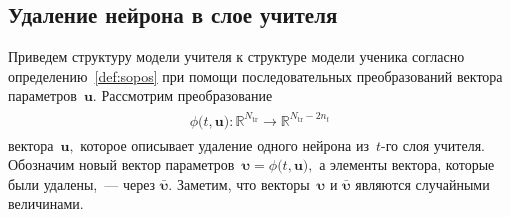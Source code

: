 \documentclass[12pt]{a&t}
\begin{document}
\subsection{Удаление нейрона в слое учителя}
Приведем структуру модели учителя к структуре модели ученика согласно определению~\ref{def:sopos} при помощи последовательных преобразований вектора параметров~$\mathbf{u}$. Рассмотрим преобразование
\begin{gather}
\label{eq:ap:2}
\begin{aligned}
\phi\bigr(t, \mathbf{u}\bigr) : \mathbb{R}^{N_{\text{tr}}} \to \mathbb{R}^{N_{\text{tr}}-2n_t}
\end{aligned}
\end{gather}
вектора~$\mathbf{u},$ которое описывает удаление одного нейрона из~$t$-го слоя учителя.
Обозначим новый вектор параметров~$\bm{\upsilon} =  \phi\bigr(t, \mathbf{u}\bigr),$ а элементы вектора, которые были удалены,~--- через $\bar{\bm{\upsilon}}.$ Заметим, что векторы~$\bm{\upsilon}$ и $\bar{\bm{\upsilon}}$ являются случайными величинами. 
\end{document}

